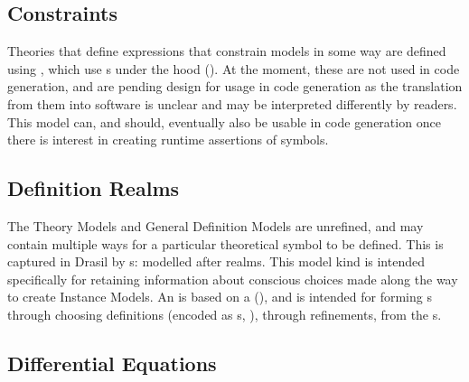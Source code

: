
\subsection{Constraints}

\currentConstraintSetHaskell{}

Theories that define expressions that constrain models in some way are defined
using \EquationalConstraints{}, which use \ConstraintSet{}s under the hood
(). At the moment, these are not used in code generation, and are pending
design for usage in code generation as the translation from them into software
is unclear and may be interpreted differently by readers. This model can, and
should, eventually also be usable in code generation once there is interest in
creating runtime assertions of symbols.


\subsection{Definition Realms}

\currentDefiningExprHaskell{}

\currentMultiDefnHaskell{}

The Theory Models and General Definition Models are unrefined, and may contain
multiple ways for a particular theoretical symbol to be defined. This is
captured in Drasil by \EquationalRealm{}s: modelled after realms. This model kind is
intended specifically for retaining information about conscious choices made
along the way to create Instance Models. An \EquationalRealm{} is based on a
\MultiDefn{} (), and is intended for forming
\QDefinition{}s through choosing definitions (encoded as \DefiningExpr{}s,
), through refinements, from the \MultiDefn{}s.


\subsection{Differential Equations}

